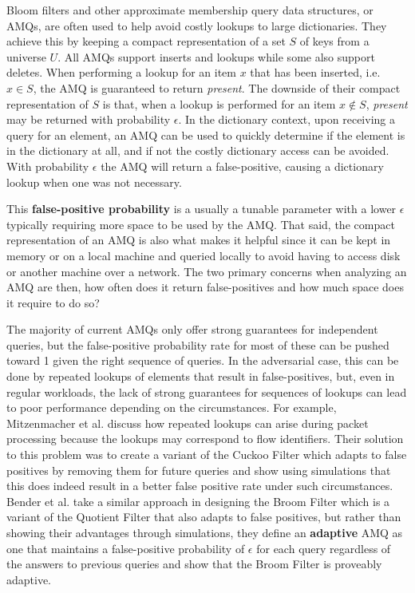 \documentclass[../paper.tex]{subfiles}
\begin{document}
    Bloom filters and other approximate membership query data structures, or
    AMQs, are often used to help avoid costly lookups to large dictionaries.
    They achieve this by keeping a compact representation of a set
    $S$ of keys from a universe $U$.  All AMQs support inserts and lookups
    while some also support deletes.  When performing a lookup for an item $x$
    that has been inserted, i.e. $x\in S$, the AMQ is guaranteed to return
    {\it present}.  The downside of their compact representation of $S$ is
    that, when a lookup is performed for an item $x \notin S$, {\it present}
    may be returned with probability $\epsilon$. In the dictionary context,
    upon receiving a query for an element, an AMQ can be used to quickly
    determine if the element is in the dictionary at all, and if not the
    costly dictionary access can be avoided. With probability $\epsilon$
    the AMQ will return a false-positive, causing a dictionary lookup
    when one was not necessary.
    
    This {\bf false-positive
    probability} is a usually a tunable parameter with a lower $\epsilon$
    typically requiring more space to be used by the AMQ.  That said, the compact representation
    of an AMQ is also what makes it helpful since it can be
    kept in memory or on a local machine and queried locally to avoid having to
    access disk or another machine over a network. The two primary
    concerns when analyzing an AMQ are then, how often does it return
    false-positives and how much space does it require to do so?

    The majority of current AMQs only offer strong guarantees for independent
    queries, but the false-positive probability rate for most of these can be
    pushed toward 1 given the right sequence of queries.  In the adversarial
    case, this can be done by repeated lookups of elements that result in
    false-positives, but, even in regular workloads, the lack of strong
    guarantees for sequences of lookups can lead to poor performance depending
    on the circumstances.  For example, Mitzenmacher et al.
    \cite{adaptive-cuckoo} discuss how repeated lookups can arise during packet
    processing because the lookups may correspond to flow identifiers.  Their
    solution to this problem was to create a variant of the Cuckoo Filter
    \cite{cuckoo-filter} which adapts to false positives by removing them for
    future queries and show using simulations that this does indeed result in a
    better false positive rate under such circumstances.  Bender et al.
    \cite{broom-filter} take a similar approach in designing the Broom Filter
    which is a variant of the Quotient Filter \cite{quotient-filter} that also
    adapts to false positives, but rather than showing their advantages through
    simulations, they define an {\bf adaptive} AMQ as one that maintains a
    false-positive probability of $\epsilon$ for each query regardless of the
    answers to previous queries and show that the Broom Filter is proveably
    adaptive.
\end{document}
